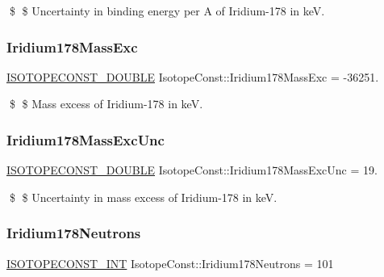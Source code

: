 \$ \$ Uncertainty in binding energy per A of Iridium-\/178 in keV. \mbox{\label{group___isotope_const-_iridium-_ir178_gac29b1807e5d68decaae387aad3c5928b}} 
\subsubsection{\texorpdfstring{Iridium178\+Mass\+Exc}{Iridium178MassExc}}
{\footnotesize\ttfamily \mbox{\hyperlink{group___isotope_const-_macros_ga8f45a7272ce02c0b4c65c44636ed719a}{I\+S\+O\+T\+O\+P\+E\+C\+O\+N\+S\+T\+\_\+\+D\+O\+U\+B\+LE}} Isotope\+Const\+::\+Iridium178\+Mass\+Exc = -\/36251.}

\$ \$ Mass excess of Iridium-\/178 in keV. \mbox{\label{group___isotope_const-_iridium-_ir178_gafbd05a2ee54369f51c2c515425eeb948}} 
\subsubsection{\texorpdfstring{Iridium178\+Mass\+Exc\+Unc}{Iridium178MassExcUnc}}
{\footnotesize\ttfamily \mbox{\hyperlink{group___isotope_const-_macros_ga8f45a7272ce02c0b4c65c44636ed719a}{I\+S\+O\+T\+O\+P\+E\+C\+O\+N\+S\+T\+\_\+\+D\+O\+U\+B\+LE}} Isotope\+Const\+::\+Iridium178\+Mass\+Exc\+Unc = 19.}

\$ \$ Uncertainty in mass excess of Iridium-\/178 in keV. \mbox{\label{group___isotope_const-_iridium-_ir178_gae1348a4e98becc9b5d162083326c8e88}} 
\subsubsection{\texorpdfstring{Iridium178\+Neutrons}{Iridium178Neutrons}}
{\footnotesize\ttfamily \mbox{\hyperlink{group___isotope_const-_macros_ga5f18360b3e99483a35c32d789e62621c}{I\+S\+O\+T\+O\+P\+E\+C\+O\+N\+S\+T\+\_\+\+I\+NT}} Isotope\+Const\+::\+Iridium178\+Neutrons = 101}

